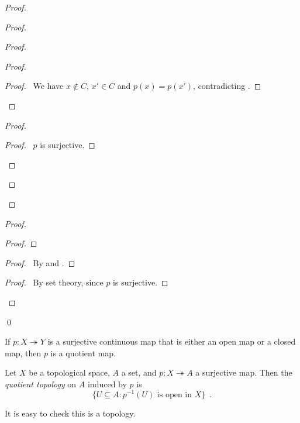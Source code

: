 \begin{proof}
\begin{proof}
\begin{proof}
\begin{proof}
        \qedstep
        \begin{proof}
          \pf\ We have $x \notin C$, $x' \in C$ and $p(x) = p(x')$,
          contradicting .
        \end{proof}
      \end{proof}
      \begin{proof}
        \begin{proof}
          \pf\ $p$ is surjective.
        \end{proof}
      \end{proof}
    \end{proof}
  \end{proof}
  \begin{proof}
    \begin{proof}
    \end{proof}
    \begin{proof}
      \pf\ By  and .
    \end{proof}
    \begin{proof}
      \pf\ By set theory, since $p$ is surjective.
    \end{proof}
  \end{proof}
  \qed
\end{proof}

\begin{cor}
  If $p : X \twoheadrightarrow Y$ is a surjective continuous map that is
  either an open map or a closed map, then $p$ is a quotient map.
\end{cor}

\begin{df}
  Let $X$ be a topological space, $A$ a set, and $p : X \twoheadrightarrow A$
  a surjective map. Then the \emph{quotient topology} on $A$ induced by $p$ is
  \[ \{ U \subseteq A : p^{-1}(U) \text{ is open in } X \} \enspace . \]

  It is easy to check this is a topology.
\end{df}

